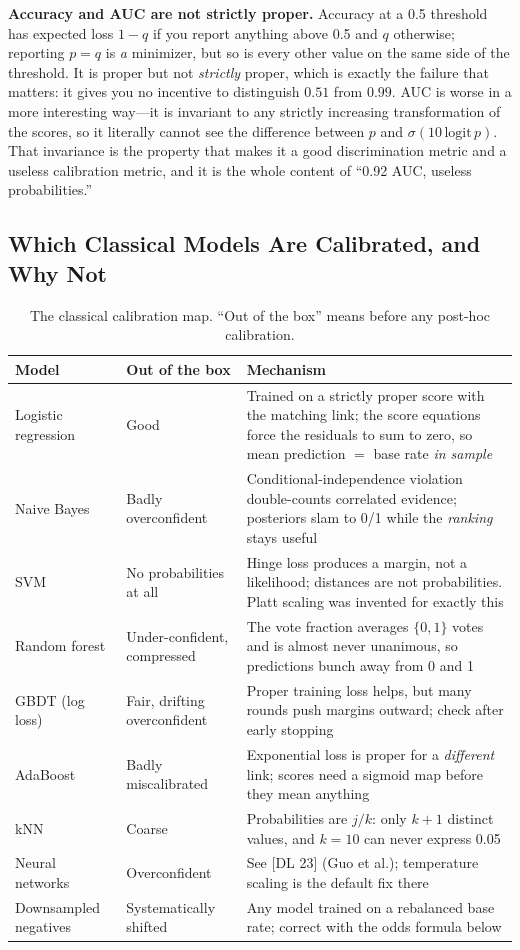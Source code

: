 \textbf{Accuracy and AUC are not strictly proper.} Accuracy at a 0.5 threshold has expected loss $1-q$ if you report anything above 0.5 and $q$ otherwise; reporting $p = q$ is \textit{a} minimizer, but so is every other value on the same side of the threshold. It is proper but not \textit{strictly} proper, which is exactly the failure that matters: it gives you no incentive to distinguish $0.51$ from $0.99$. AUC is worse in a more interesting way---it is invariant to any strictly increasing transformation of the scores, so it literally cannot see the difference between $p$ and $\sigma(10\,\mathrm{logit}\,p)$. That invariance is the property that makes it a good discrimination metric and a useless calibration metric, and it is the whole content of ``0.92 AUC, useless probabilities.''

\subsection{Which Classical Models Are Calibrated, and Why Not}

\begin{table}[H]
\centering
\small
\caption{The classical calibration map. ``Out of the box'' means before any post-hoc calibration.}
\label{cml:tab:calib_map}
\begin{tabularx}{\textwidth}{llX}
\toprule
\textbf{Model} & \textbf{Out of the box} & \textbf{Mechanism} \\
\midrule
Logistic regression & Good & Trained on a strictly proper score with the matching link; the score equations force the residuals to sum to zero, so mean prediction $=$ base rate \textit{in sample} \\
Naive Bayes & Badly overconfident & Conditional-independence violation double-counts correlated evidence; posteriors slam to 0/1 while the \textit{ranking} stays useful \\
SVM & No probabilities at all & Hinge loss produces a margin, not a likelihood; distances are not probabilities. Platt scaling was invented for exactly this \\
Random forest & Under-confident, compressed & The vote fraction averages $\{0,1\}$ votes and is almost never unanimous, so predictions bunch away from 0 and 1 \\
GBDT (log loss) & Fair, drifting overconfident & Proper training loss helps, but many rounds push margins outward; check after early stopping \\
AdaBoost & Badly miscalibrated & Exponential loss is proper for a \textit{different} link; scores need a sigmoid map before they mean anything \\
kNN & Coarse & Probabilities are $j/k$: only $k+1$ distinct values, and $k=10$ can never express 0.05 \\
Neural networks & Overconfident & See [DL 23] (Guo et al.); temperature scaling is the default fix there \\
Downsampled negatives & Systematically shifted & Any model trained on a rebalanced base rate; correct with the odds formula below \\
\bottomrule
\end{tabularx}
\end{table}

